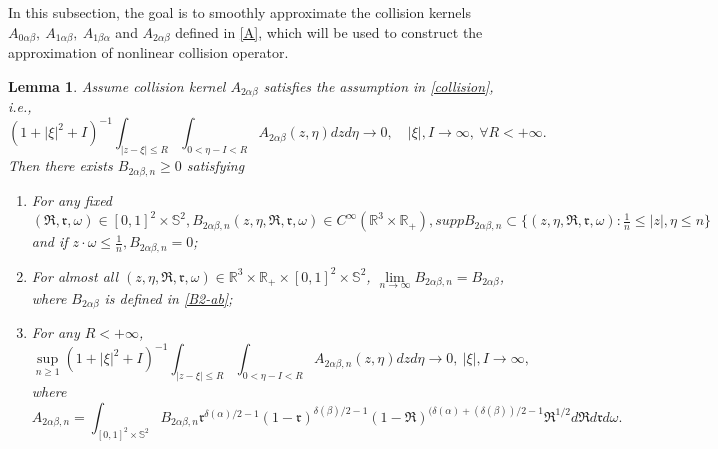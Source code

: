 \documentclass[reqno,11pt]{amsart}
\newtheorem{lemma}{Lemma}[section]
\numberwithin{equation}{section}
\def\R{\mathbb{R}}
\begin{document}
In this subsection, the goal is to smoothly approximate the collision kernels $A_{0\alpha \beta },\ A_{1\alpha \beta },\ A_{1\beta \alpha }$ and $ A_{2\alpha \beta }$ defined in \eqref{A}, which will be used to construct the approximation of nonlinear collision operator.

	\begin{lemma}\label{Lemma 4.10}
	Assume collision kernel $A_{2\alpha \beta }$ satisfies the assumption in \eqref{collision}, i.e.,
	\begin{equation*}
		(1+|\xi|^2 + I )^{-1} \int_{|z-\xi |\leq R } \int_{0<\eta -I < R } A_{2\alpha \beta } (z,\eta ) dzd\eta \rightarrow 0, \quad |\xi|, I \rightarrow \infty , \ \forall R <+\infty .
	\end{equation*}	
	Then there exists $B_{2\alpha \beta ,n }\geq 0 $ satisfying
	\begin{enumerate}
		\item {For any fixed $(\mathfrak{R},\mathfrak{r},\omega)\in [0,1]^2 \times \mathbb{S}^2, B_{2\alpha \beta , n } (z,\eta , \mathfrak{R},\mathfrak{r},\omega ) \in C^\infty (\R^3 \times \R_+), supp B_{2\alpha \beta , n } \subset \{(z,\eta , \mathfrak{R},\mathfrak{r},\omega ): \frac{1}{n} \leq |z|,\eta \leq n \}$ and if $ z \cdot \omega \leq \frac{1}{n}, B_{2\alpha \beta , n } =0$;	}\label{1 of Lemma 4.10}
		\item  {For almost all $(z,\eta , \mathfrak{R},\mathfrak{r},\omega )\in \R^3 \times \R_+ \times [0,1]^2 \times \mathbb{S}^2$, 
  $ \lim \limits_{n\rightarrow \infty } B_{2\alpha \beta ,n } =B_{2\alpha \beta } $, where $B_{2\alpha \beta }$ is defined in \eqref{B2-ab};
  } \label{2 of Lemma 4.10}
		\item {For any $R < + \infty$,
		\begin{equation*}
		\sup \limits_{n \geq 1} (1+|\xi|^2 + I )^{-1} \int_{|z-\xi |\leq R } \int_{0<\eta -I < R } A_{2\alpha \beta ,n } (z,\eta ) dzd\eta \rightarrow 0, \ |\xi|, I \rightarrow \infty ,
		\end{equation*}	
  where 
  \begin{equation*}
    A_{2\alpha \beta ,n }=\int_{[0,1]^2 \times \mathbb{S}^2} B_{2\alpha \beta ,n } \mathfrak{r}^{\delta(\alpha)/2-1 } (1-\mathfrak{r})^{\delta(\beta )/2-1} (1-\mathfrak{R})^{(\delta(\alpha)+(\delta(\beta ))/2-1} \mathfrak{R}^{1/2}  d\mathfrak{R}d\mathfrak{r}d\omega.  
  \end{equation*} 
}\label{3 of Lemma 4.10}
	\end{enumerate}
\end{lemma}
\end{document}
